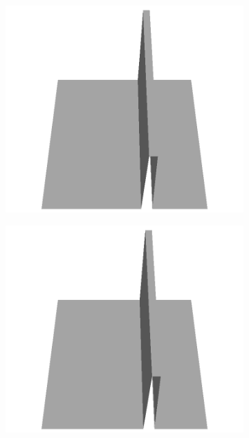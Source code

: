 \documentclass[../document.tex]{subfiles}
\begin{document}
\begin{figure}[H]
    \begin{subfigure}[b]{0.065\textwidth}
    \includegraphics[width=\linewidth]{../img/5/custom_patches/walls_front/all/51-3d.png}
    \end{subfigure}
    \begin{subfigure}[b]{0.065\textwidth}
    \includegraphics[width=\linewidth]{../img/5/custom_patches/walls_front/all/50-3d.png}
    \end{subfigure}
    \begin{subfigure}[b]{0.065\textwidth}

\end{subfigure}
\end{figure}
\end{document}
